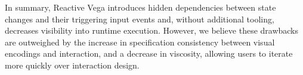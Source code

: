 In summary, Reactive Vega introduces hidden dependencies between state changes
and their triggering input events and, without additional tooling, decreases
visibility into runtime execution. However, we believe these drawbacks are
outweighed by the increase in specification consistency between visual encodings
and interaction, and a decrease in viscosity, allowing users to iterate more
quickly over interaction design.